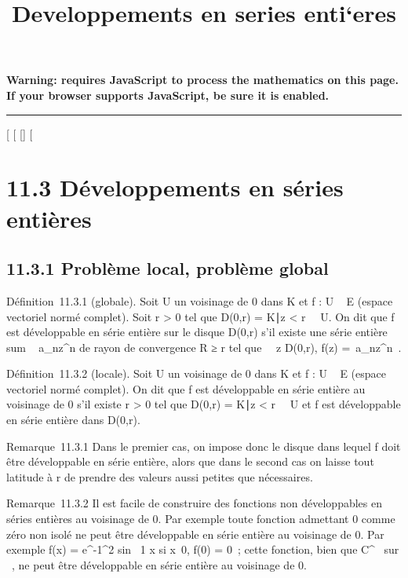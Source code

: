\documentclass[]{article}
\title{Developpements en series enti`eres}
\author{}
\date{}
\begin{document}
\maketitle

\textbf{Warning: 
requires JavaScript to process the mathematics on this page.\\ If your
browser supports JavaScript, be sure it is enabled.}

\begin{center}\rule{3in}{0.4pt}\end{center}

[
[
[]
[

\section{11.3 Développements en séries entières}

\subsection{11.3.1 Problème local, problème global}

Définition~11.3.1 (globale). Soit U un voisinage de 0 dans K et f : U \rightarrow~
E (espace vectoriel normé complet). Soit r > 0 tel que
D(0,r) = \z \in
K∣z <
r\ \subset~ U. On dit que f est développable en série entière
sur le disque D(0,r) s'il existe une série entière
\\sum ~
a_nz^n de rayon de convergence R ≥ r tel que
\forall~~z \in D(0,r), f(z) =\
\sum  a_nz^n~.

Définition~11.3.2 (locale). Soit U un voisinage de 0 dans K et f : U \rightarrow~ E
(espace vectoriel normé complet). On dit que f est développable en série
entière au voisinage de 0 s'il existe r > 0 tel que D(0,r)
= \z \in
K∣z <
r\ \subset~ U et f est développable en série entière dans
D(0,r).

Remarque~11.3.1 Dans le premier cas, on impose donc le disque dans
lequel f doit être développable en série entière, alors que dans le
second cas on laisse tout latitude à r de prendre des valeurs aussi
petites que nécessaires.

Remarque~11.3.2 Il est facile de construire des fonctions non
développables en séries entières au voisinage de 0. Par exemple toute
fonction admettant 0 comme zéro non isolé ne peut être développable en
série entière au voisinage de 0. Par exemple f(x) =
e^-1\diagupx^2  sin~  1
\over x si x\neq~0, f(0) = 0~;
cette fonction, bien que C^\infty~ sur ~, ne peut être développable
en série entière au voisinage de 0.
\end{document}
